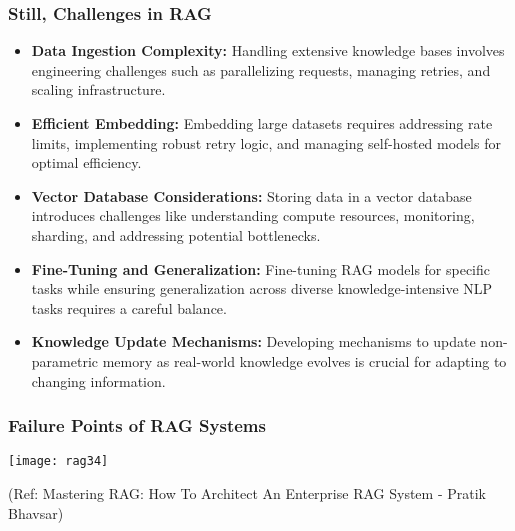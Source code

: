 \begin{frame}[fragile]\frametitle{Still, Challenges in RAG}
  \begin{itemize}
    \item \textbf{Data Ingestion Complexity:} Handling extensive knowledge bases involves engineering challenges such as parallelizing requests, managing retries, and scaling infrastructure.
    \item \textbf{Efficient Embedding:} Embedding large datasets requires addressing rate limits, implementing robust retry logic, and managing self-hosted models for optimal efficiency.
    \item \textbf{Vector Database Considerations:} Storing data in a vector database introduces challenges like understanding compute resources, monitoring, sharding, and addressing potential bottlenecks.
    \item \textbf{Fine-Tuning and Generalization:} Fine-tuning RAG models for specific tasks while ensuring generalization across diverse knowledge-intensive NLP tasks requires a careful balance.
    \item \textbf{Knowledge Update Mechanisms:} Developing mechanisms to update non-parametric memory as real-world knowledge evolves is crucial for adapting to changing information.
  \end{itemize}
\end{frame}



\begin{frame}[fragile]\frametitle{Failure Points of RAG Systems}


		\begin{center}
		\texttt{[image: rag34]}
		\end{center}

{\tiny (Ref: Mastering RAG: How To Architect An Enterprise RAG System - Pratik Bhavsar)}

\end{frame}

